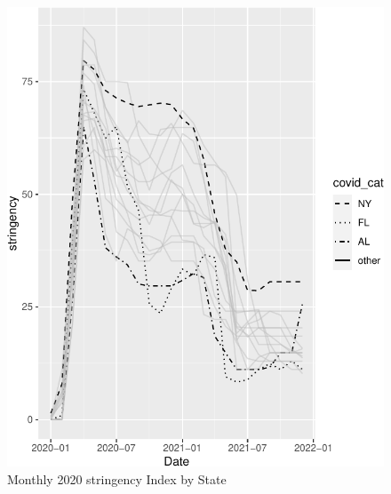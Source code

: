 \documentclass[12pt]{article}
\begin{document}
\begin{figure}

{\centering \includegraphics{C19PolicyRec_files/figure-latex/pString-1} 

}

\caption{Monthly 2020 stringency Index by State}\label{fig:pString}
\end{figure}
\end{document}
